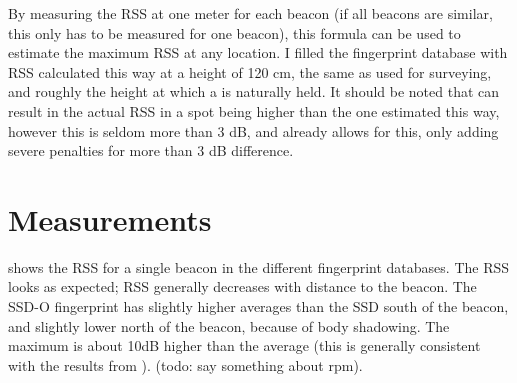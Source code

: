 By measuring the RSS at one meter for each beacon (if all beacons are similar, this only has to be measured for one beacon), this formula can be used to estimate the maximum RSS at any location.
I filled the fingerprint database with RSS calculated this way at a height of 120 cm, the same as used for surveying, and roughly the height at which a \device is naturally held.
It should be noted that \mpp can result in the actual RSS in a spot being higher than the one estimated this way, however this is seldom more than 3 dB, and  already allows for this, only adding severe penalties for more than 3 dB difference.

\section{Measurements}

 shows the RSS for a single beacon in the different fingerprint databases.
The RSS looks as expected; RSS generally decreases with distance to the beacon.
The SSD-O fingerprint has slightly higher averages than the SSD south of the beacon, and slightly lower north of the beacon, because of body shadowing.
The maximum is about 10dB higher than the average (this is generally consistent with the results from ).
(todo: say something about rpm).


